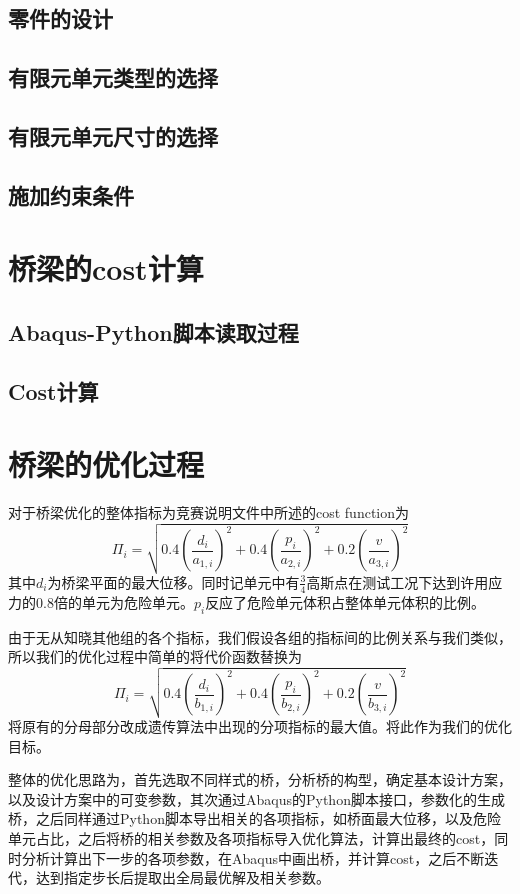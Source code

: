 \documentclass[forprint]{WHUBachelor}
\begin{document}
\section{零件的设计}
\section{有限元单元类型的选择}
\section{有限元单元尺寸的选择}
\section{施加约束条件}
\chapter{桥梁的cost计算}
\section{Abaqus-Python脚本读取过程}
\section{Cost计算}
\chapter{桥梁的优化过程}
对于桥梁优化的整体指标为竞赛说明文件中所述的cost function为
\begin {equation} 
\Pi_{i}=\sqrt{0.4\left(\frac{d_{i}}{a_{1, i}}\right)^{2}+0.4\left(\frac{p_{i}}{a_{2, i}}\right)^{2}+0.2\left(\frac{v}{a_{3, i}}\right)^{2}}
 \end {equation}
其中$d_i$为桥梁平面的最大位移。同时记单元中有$\frac{3}{4}$高斯点在测试工况下达到许用应力的0.8倍的单元为危险单元。$p_i$反应了危险单元体积占整体单元体积的比例。\par
由于无从知晓其他组的各个指标，我们假设各组的指标间的比例关系与我们类似，所以我们的优化过程中简单的将代价函数替换为
\begin {equation} 
\Pi_{i}=\sqrt{0.4\left(\frac{d_{i}}{b_{1, i}}\right)^{2}+0.4\left(\frac{p_{i}}{b_{2, i}}\right)^{2}+0.2\left(\frac{v}{b_{3, i}}\right)^{2}}
 \end {equation}
将原有的分母部分改成遗传算法中出现的分项指标的最大值。将此作为我们的优化目标。\par
整体的优化思路为，首先选取不同样式的桥，分析桥的构型，确定基本设计方案，以及设计方案中的可变参数，其次通过Abaqus的Python脚本接口，参数化的生成桥，之后同样通过Python脚本导出相关的各项指标，如桥面最大位移，以及危险单元占比，之后将桥的相关参数及各项指标导入优化算法，计算出最终的cost，同时分析计算出下一步的各项参数，在Abaqus中画出桥，并计算cost，之后不断迭代，达到指定步长后提取出全局最优解及相关参数。
\end{document}
